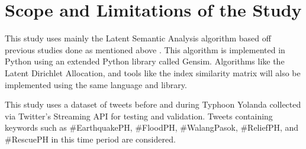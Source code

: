 \section{Scope and Limitations of the Study}

This study uses mainly the Latent Semantic Analysis algorithm based off previous studies done as mentioned above \cite{ROSALES2017, VELASCOBERMEJODOMINGO2018}. This algorithm is implemented in Python using an extended Python library called Gensim. Algorithms like the Latent Dirichlet Allocation, and tools like the index similarity matrix will also be implemented using the same language and library. 

This study uses a dataset of tweets before and during Typhoon Yolanda collected via Twitter's Streaming API for testing and validation. Tweets containing keywords such as #EarthquakePH, #FloodPH, #WalangPasok, #ReliefPH, and #RescuePH in this time period are considered. 